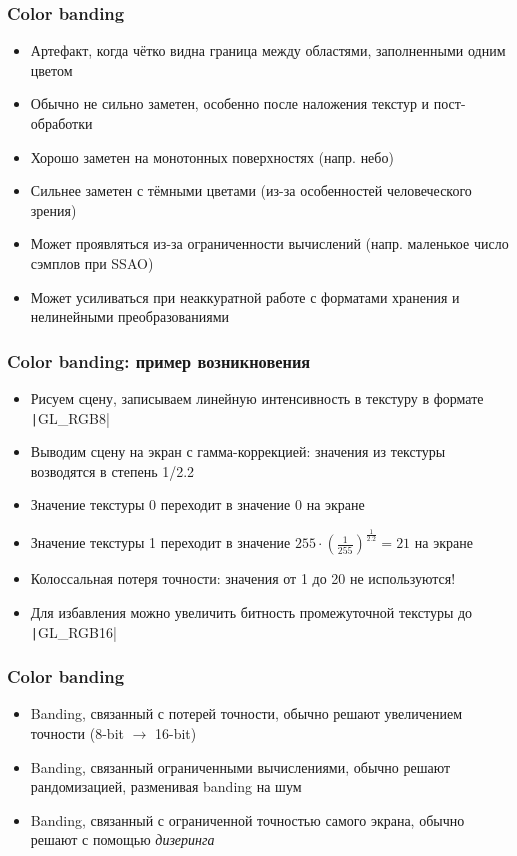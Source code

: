 \documentclass[10pt]{beamer}
\begin{document}
\begin{frame}[fragile]
\frametitle{Color banding}
\begin{itemize}
\item Артефакт, когда чётко видна граница между областями, заполненными одним цветом
\pause
\item Обычно не сильно заметен, особенно после наложения текстур и пост-обработки
\pause
\item Хорошо заметен на монотонных поверхностях (напр. небо)
\pause
\item Сильнее заметен с тёмными цветами (из-за особенностей человеческого зрения)
\pause
\item Может проявляться из-за ограниченности вычислений (напр. маленькое число сэмплов при SSAO)
\pause
\item Может усиливаться при неаккуратной работе с форматами хранения и нелинейными преобразованиями
\end{itemize}
\end{frame}

\begin{frame}[fragile]
\frametitle{Color banding: пример возникновения}
\begin{itemize}
\item Рисуем сцену, записываем линейную интенсивность в текстуру в формате \texttt|GL_RGB8|
\pause
\item Выводим сцену на экран с гамма-коррекцией: значения из текстуры возводятся в степень 1/2.2
\pause
\item Значение текстуры 0 переходит в значение 0 на экране
\pause
\item Значение текстуры 1 переходит в значение \begin{math}255 \cdot \left(\frac{1}{255}\right)^\frac{1}{2.2} = 21\end{math} на экране
\pause
\item Колоссальная потеря точности: значения от 1 до 20 не используются!
\pause
\item Для избавления можно увеличить битность промежуточной текстуры до \texttt|GL_RGB16|
\end{itemize}
\end{frame}

\begin{frame}[fragile]
\frametitle{Color banding}
\begin{itemize}
\item Banding, связанный с потерей точности, обычно решают увеличением точности (8-bit \begin{math}\longrightarrow\end{math} 16-bit)
\pause
\item Banding, связанный ограниченными вычислениями, обычно решают рандомизацией, разменивая banding на шум
\pause
\item Banding, связанный с ограниченной точностью самого экрана, обычно решают с помощью \textit{дизеринга}
\end{itemize}
\end{frame}
\end{document}
